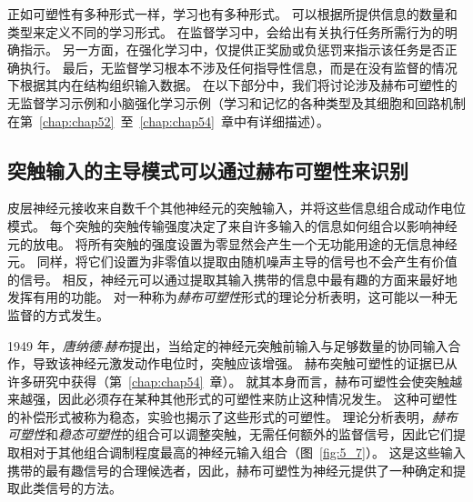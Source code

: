正如可塑性有多种形式一样，学习也有多种形式。
可以根据所提供信息的数量和类型来定义不同的学习形式。
在监督学习中，会给出有关执行任务所需行为的明确指示。
另一方面，在强化学习中，仅提供正奖励或负惩罚来指示该任务是否正确执行。
最后，无监督学习根本不涉及任何指导性信息，而是在没有监督的情况下根据其内在结构组织输入数据。
在以下部分中，我们将讨论涉及赫布可塑性的无监督学习示例和小脑强化学习示例（学习和记忆的各种类型及其细胞和回路机制在第~\ref{chap:chap52}~至~\ref{chap:chap54}~章中有详细描述）。



\subsection{突触输入的主导模式可以通过赫布可塑性来识别}

皮层神经元接收来自数千个其他神经元的突触输入，并将这些信息组合成动作电位模式。
每个突触的突触传输强度决定了来自许多输入的信息如何组合以影响神经元的放电。
将所有突触的强度设置为零显然会产生一个无功能用途的无信息神经元。
同样，将它们设置为非零值以提取由随机噪声主导的信号也不会产生有价值的信号。
相反，神经元可以通过提取其输入携带的信息中最有趣的方面来最好地发挥有用的功能。
对一种称为\textit{赫布可塑性}形式的理论分析表明，这可能以一种无监督的方式发生。


1949 年，\textit{唐纳德$\cdot$赫布}提出，当给定的神经元突触前输入与足够数量的协同输入合作，导致该神经元激发动作电位时，突触应该增强。
赫布突触可塑性的证据已从许多研究中获得（第~\ref{chap:chap54}~章）。 
就其本身而言，赫布可塑性会使突触越来越强，因此必须存在某种其他形式的可塑性来防止这种情况发生。 
这种可塑性的补偿形式被称为稳态，实验也揭示了这些形式的可塑性。 
理论分析表明，\textit{赫布可塑性}和\textit{稳态可塑性}的组合可以调整突触，无需任何额外的监督信号，因此它们提取相对于其他组合调制程度最高的神经元输入组合（图~\ref{fig:5_7}）。 
这是这些输入携带的最有趣信号的合理候选者，因此，赫布可塑性为神经元提供了一种确定和提取此类信号的方法。


